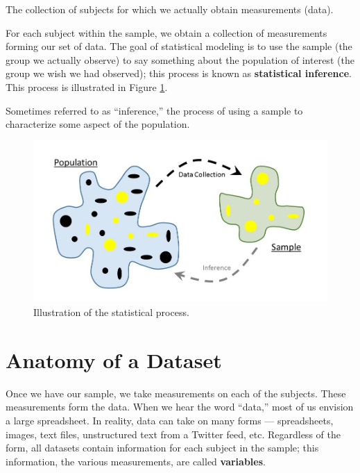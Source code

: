 \documentclass[]{book}
\theoremstyle{definition}
\theoremstyle{definition}
\theoremstyle{remark}
\let\BeginKnitrBlock\begin \let\EndKnitrBlock\end
\begin{document}
\BeginKnitrBlock{definition}[Sample]
\protect\hypertarget{def:defn-sample}{}{\label{def:defn-sample}
{} }The collection of subjects for which we
actually obtain measurements (data).
\EndKnitrBlock{definition}

For each subject within the sample, we obtain a collection of
measurements forming our set of data. The goal of statistical modeling
is to use the sample (the group we actually observe) to say something
about the population of interest (the group we wish we had observed);
this process is known as \textbf{statistical inference}. This process is
illustrated in Figure \ref{fig:basics-statistical-process}.

\BeginKnitrBlock{definition}[Statistical Inference]
\protect\hypertarget{def:defn-inference}{}{\label{def:defn-inference}
{} }Sometimes referred to as
``inference,'' the process of using a sample to characterize some aspect
of the population.
\EndKnitrBlock{definition}

\begin{figure}

{\centering \includegraphics[width=0.8\linewidth]{images/Basics-Stat-Process} 

}

\caption{Illustration of the statistical process.}\label{fig:basics-statistical-process}
\end{figure}

\section{Anatomy of a Dataset}\label{anatomy-of-a-dataset}

Once we have our sample, we take measurements on each of the subjects.
These measurements form the data. When we hear the word ``data,'' most
of us envision a large spreadsheet. In reality, data can take on many
forms --- spreadsheets, images, text files, unstructured text from a
Twitter feed, etc. Regardless of the form, all datasets contain
information for each subject in the sample; this information, the
various measurements, are called \textbf{variables}.
\end{document}
